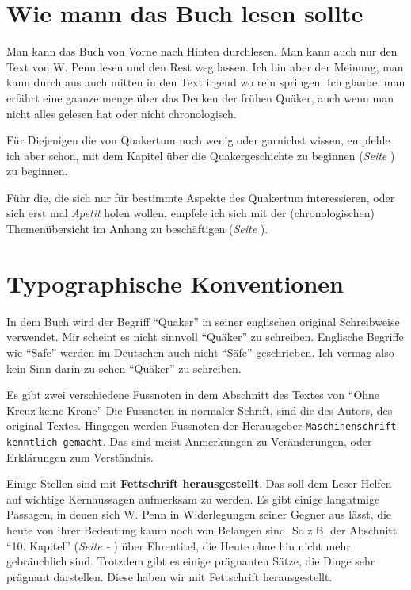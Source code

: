 \chapter{Wie mann das Buch lesen sollte}

Man kann das Buch von Vorne nach Hinten durchlesen. Man kann auch nur den Text
von W. Penn lesen und den Rest weg lassen. Ich bin aber der Meinung, man kann
durch aus auch mitten in den Text irgend wo rein springen. Ich glaube, man
erfährt eine gaanze menge über das Denken der frühen Quäker, auch wenn man nicht
alles gelesen hat oder nicht chronologisch.

\medskip

Für Diejenigen die von Quakertum noch wenig oder garnichst wissen, empfehle ich
aber schon, mit dem Kapitel über die Quakergeschichte zu beginnen (\textit{Seite
\pageref{ref:entwicklung_quakertum}}) zu beginnen.

\medskip

Führ die, die sich nur für bestimmte Aspekte des Quakertum interessieren, oder
sich erst mal \textit{Apetit} holen wollen, empfele ich sich mit der
(chronologischen) Themenübersicht im Anhang zu beschäftigen (\textit{Seite
\pageref{ref:theme_nuebersicht}}).

\chapter{Typographische Konventionen}

In dem Buch wird der Begriff "`Quaker"'  in seiner
englischen original Schreibweise verwendet. Mir scheint es nicht sinnvoll
"`Quäker"' zu schreiben. Englische Begriffe wie "`Safe"' werden im Deutschen
auch nicht "`Säfe"' geschrieben. Ich vermag also kein Sinn darin zu sehen
"`Quäker"' zu schreiben.

\medskip

Es gibt zwei verschiedene Fussnoten in dem Abschnitt des Textes von "`Ohne Kreuz
keine Krone"' Die Fussnoten in normaler Schrift, sind die des Autors, des
original Textes. Hingegen werden Fussnoten der Herausgeber
\texttt{Maschinenschrift kenntlich gemacht}. Das sind meist Anmerkungen zu
Veränderungen, oder Erklärungen zum Verständnis.

\medskip

Einige Stellen sind mit \textbf{Fettschrift herausgestellt}. Das soll dem Leser
Helfen auf wichtige Kernaussagen aufmerksam zu werden. Es gibt einige langatmige
Passagen, in denen sich W. Penn in Widerlegungen seiner Gegner aus lässt, die
heute von ihrer Bedeutung kaum noch von Belangen sind. So z.B. der Abschnitt
"`10. Kapitel"' (\textit{Seite \pageref{kap10} - \pageref{kap10_ende}}) über
Ehrentitel, die Heute ohne hin nicht mehr gebräuchlich sind. Trotzdem gibt es
einige prägnanten Sätze, die Dinge sehr prägnant darstellen. Diese haben wir mit
Fettschrift herausgestellt.

